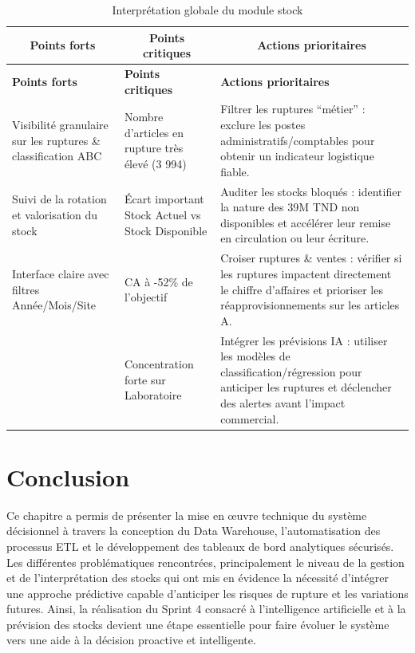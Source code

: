 {\small
\renewcommand{\arraystretch}{1.2}
\setlength{\tabcolsep}{4pt}


\begin{longtable}{|p{4.5cm}|p{4.5cm}|p{7cm}|}

\caption{Interprétation globale du module stock} \\

\hline
\multicolumn{1}{|c|}{\textbf{Points forts}} & 
\multicolumn{1}{c|}{\textbf{Points critiques}} & 
\multicolumn{1}{c|}{\textbf{Actions prioritaires}} \\
\hline
\endfirsthead

\hline
\rowcolor{cyan!20}
\textbf{Points forts} & \textbf{Points critiques} & \textbf{Actions prioritaires} \\
\hline
\endhead

\hline
\endfoot

Visibilité granulaire sur les ruptures \& classification ABC & Nombre d'articles en rupture très élevé (3 994) & Filtrer les ruptures ``métier'' : exclure les postes administratifs/comptables pour obtenir un indicateur logistique fiable. \\
\hline

Suivi de la rotation et valorisation du stock & Écart important Stock Actuel vs Stock Disponible & Auditer les stocks bloqués : identifier la nature des 39M TND non disponibles et accélérer leur remise en circulation ou leur écriture. \\
\hline

Interface claire avec filtres Année/Mois/Site & CA à -52\% de l'objectif & Croiser ruptures \& ventes : vérifier si les ruptures impactent directement le chiffre d'affaires et prioriser les réapprovisionnements sur les articles A. \\
\hline

 & Concentration forte sur Laboratoire & Intégrer les prévisions IA : utiliser les modèles de classification/régression pour anticiper les ruptures et déclencher des alertes avant l'impact commercial. \\
\hline

\end{longtable}
}

\section{Conclusion}
Ce chapitre a permis de présenter la mise en œuvre technique du système décisionnel à travers la conception du Data Warehouse, l’automatisation des processus ETL et le développement des tableaux de bord analytiques sécurisés. Les différentes problématiques rencontrées, principalement le niveau de la gestion et de l’interprétation des stocks qui ont mis en évidence la nécessité d’intégrer une approche prédictive capable d’anticiper les risques de rupture et les variations futures. Ainsi, la réalisation du Sprint 4 consacré à l’intelligence artificielle et à la prévision des stocks devient une étape essentielle pour faire évoluer le système vers une aide à la décision proactive et intelligente. 



